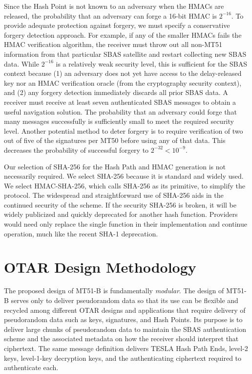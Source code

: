\documentclass[letterpaper,times]{IONconf/IONconf}
\begin{document}
		Since the Hash Point is not known to an adversary when the HMACs are released, the probability that an adversary can forge a 16-bit HMAC is $2^{-16}$.
		To provide adequate protection against forgery, we must specify a conservative forgery detection approach.
		For example, if any of the smaller HMACs fails the HMAC verification algorithm, the receiver must throw out all non-MT51 information from that particular SBAS satellite and restart collecting new SBAS data.
		While $2^{-16}$ is a relatively weak security level, this is sufficient for the SBAS context because (1) an adversary does not yet have access to the delay-released key nor an HMAC verification oracle (from the cryptography security context), and (2) any forgery detection immediately discards all prior SBAS data.
		A receiver must receive at least seven authenticated SBAS messages to obtain a useful navigation solution.
		The probability that an adversary could forge that many messages successfully is {}sufficiently small to meet the required security level.
		Another potential method to deter forgery is to require verification of two out of five of the signatures per MT50 before using any of that data.
		This decreases the probability of successful forgery to $2^{-32} < 10^{-9}$.		

		Our selection of SHA-256 for the Hash Path and HMAC generation is not necessarily required.
		We select SHA-256 because it is standard and widely used.
		We select HMAC-SHA-256, which calls SHA-256 as its primitive, to simplify the protocol.
		The widespread and straightforward use of SHA-256 aids in the continued security of the scheme.
		If the security SHA-256 is broken, it will be widely publicized and quickly deprecated for another hash function.
		Providers would need only replace the single function in their implementation and continue operation, much like the recent SHA-1 deprecation.

\section{OTAR Design Methodology} \label{sec:otar_design_methodology}

	The proposed design of MT51-B is fundamentally {\em modular}.
	The design of MT51-B serves only to deliver pseudorandom data so that its use can be flexible and recycled among different OTAR designs and applications that require delivery of pseudorandom data such as keys, signatures, and Hash Points. 
	Its purpose is to deliver large chunks of pseudorandom data to maintain the SBAS authentication scheme and the associated metadata on how the receiver should interpret that ciphertext.
	The same message definition delivers TESLA Hash Path Ends, level-2 keys, level-1-key decryption keys, and the authenticating ciphertext required to authenticate each.
\end{document}
